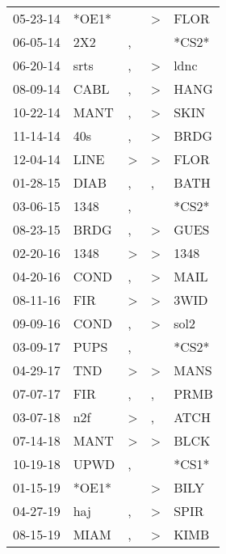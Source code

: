 \begin{supertabular}{lllll}
 05-23-14 &  *OE1* &               &  \textgreater &   FLOR \\
 06-05-14 &    2X2 &             , &               &  *CS2* \\
 06-20-14 &   srts &             , &  \textgreater &   ldnc \\
 08-09-14 &   CABL &             , &  \textgreater &   HANG \\
 10-22-14 &   MANT &             , &  \textgreater &   SKIN \\
 11-14-14 &    40s &             , &  \textgreater &   BRDG \\
 12-04-14 &   LINE &  \textgreater &  \textgreater &   FLOR \\
 01-28-15 &   DIAB &             , &             , &   BATH \\
 03-06-15 &   1348 &             , &               &  *CS2* \\
 08-23-15 &   BRDG &             , &  \textgreater &   GUES \\
 02-20-16 &   1348 &  \textgreater &  \textgreater &   1348 \\
 04-20-16 &   COND &             , &  \textgreater &   MAIL \\
 08-11-16 &    FIR &  \textgreater &  \textgreater &   3WID \\
 09-09-16 &   COND &             , &  \textgreater &   sol2 \\
 03-09-17 &   PUPS &             , &               &  *CS2* \\
 04-29-17 &    TND &  \textgreater &  \textgreater &   MANS \\
 07-07-17 &    FIR &             , &             , &   PRMB \\
 03-07-18 &    n2f &  \textgreater &             , &   ATCH \\
 07-14-18 &   MANT &  \textgreater &  \textgreater &   BLCK \\
 10-19-18 &   UPWD &             , &               &  *CS1* \\
 01-15-19 &  *OE1* &               &  \textgreater &   BILY \\
 04-27-19 &    haj &             , &  \textgreater &   SPIR \\
 08-15-19 &   MIAM &             , &  \textgreater &   KIMB \\
\end{supertabular}
